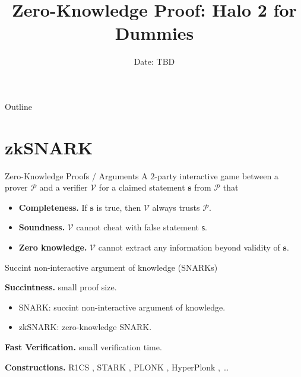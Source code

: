 \documentclass{beamer}
\title{Zero-Knowledge Proof: Halo 2 for Dummies}
\date{Date: TBD}
\newcommand{\prover}{\mathcal{P}}
\newcommand{\verifier}{\mathcal{V}}
\begin{document}
	\begin{frame}
		\titlepage
	\end{frame}
	
	\begin{frame}{Outline}
		\tableofcontents
	\end{frame}
	\section{zkSNARK}
	\begin{frame}{Zero-Knowledge Proofs / Arguments}
		A $2$-party interactive game between a prover $\prover$ and a verifier $\verifier$ for a claimed statement $\mathbf{s}$ from $\prover$ that 
		\begin{itemize}
			\item \textbf{Completeness.} If $\mathbf{s}$ is true, then $\verifier$ always trusts $\prover$. 
			\item \textbf{Soundness.} $\verifier$ cannot cheat with false statement $\mathsf{s}$.
			\item \textbf{Zero knowledge.} $\verifier$ cannot extract any information beyond validity of $\mathbf{s}$. 
		\end{itemize}
	\end{frame}
	
	\begin{frame}{Succint non-interactive argument of knowledge (SNARKs)}
		
		\textbf{Succintness.} small proof size.
		\begin{itemize}
			\item SNARK: succint non-interactive argument of knowledge.
			\item zkSNARK: zero-knowledge SNARK.
		\end{itemize}
		
		\textbf{Fast Verification.} small verification time.
		
		\textbf{Constructions.} R1CS \cite{eurocrypt/Groth16}, STARK \cite{iacr/Ben-SassonBHR18}, PLONK \cite{iacr/GabizonWC19}, HyperPlonk \cite{iacr/ChenBBZ22}, \dots
	\end{frame}
\end{document}
